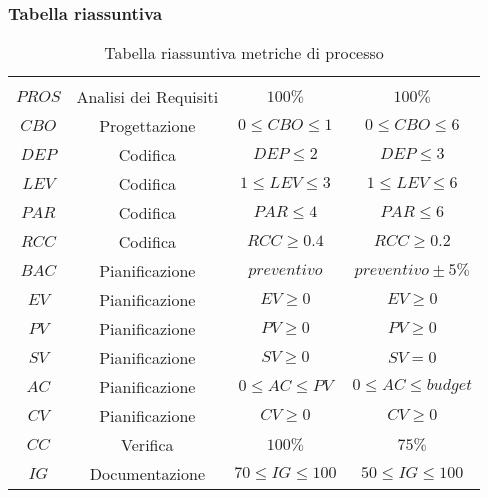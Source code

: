 \subsubsection{Tabella riassuntiva}
\begin{table}[H]
	\begin{center}
		\caption{Tabella riassuntiva metriche di processo}
		\begin{tabular}{cc!{\color[HTML]{9b240a}\vrule width 0.05cm}cc}
			\rowcolorhead
			 &  &  &  \\

			$PROS$               & Analisi dei Requisiti       & $100\%$                          & $100\% $                           \\
			$CBO$                & Progettazione               & $0\leq CBO\leq 1$                & $0 \leq CBO \leq 6$                    \\
			$DEP$                & Codifica                    & $DEP\leq 2$                      & $DEP \leq 3     $                    \\
			$LEV$                & Codifica                    & $1\leq LEV \leq 3$               & $1\leq LEV \leq 6$                    \\
			$PAR$                & Codifica                    & $PAR\leq 4$                      & $PAR\leq6     $                    \\
			$RCC$                & Codifica                    & $RCC \geq 0.4$                   & $RCC\geq0.2   $                    \\
			$BAC$                & Pianificazione              & $preventivo$                     & $preventivo \pm 5\%$      \\
			$EV$                 & Pianificazione              & $EV \geq 0$                      & $EV\geq0$                          \\
			$PV$                 & Pianificazione              & $PV \geq0$                       & $PV\geq0$                          \\
			$SV$                 & Pianificazione              & $SV \geq 0$                      & $SV=0   $                          \\
			$AC$                 & Pianificazione              & $0 \leq AC \leq PV$              & $0 \leq AC\leq budget$       \\
			$CV$                 & Pianificazione              & $CV \geq 0 $                     & $CV\geq 0$                          \\
			$CC$                 & Verifica                    & $100\% $                         & $75\%    $                         \\
			$IG$                 & Documentazione              & $70\leq IG \leq 100$             & $50\leq IG \leq 100$                  \\
		\end{tabular}

	\end{center}
\end{table}